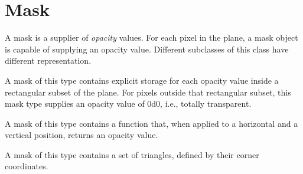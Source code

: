 \chapter{Mask}


A mask is a supplier of \emph{opacity} values.  For each pixel in the
plane, a mask object is capable of supplying an opacity value.
Different subclasses of this class have different representation.


A mask of this type contains explicit storage for each opacity value
inside a rectangular subset of the plane.  For pixels outside that
rectangular subset, this mask type supplies an opacity value of 0d0,
i.e., totally transparent.


A mask of this type contains a function that, when applied to a
horizontal and a vertical position, returns an opacity value.


A mask of this type contains a set of triangles, defined by their
corner coordinates.
